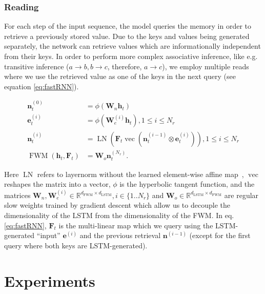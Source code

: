 \documentclass{article} \usepackage{iclr2021_conference,times}
\def\ve{{\bm{e}}}
\def\vh{{\bm{h}}}
\def\vn{{\bm{n}}}
\def\mF{{\bm{F}}}
\def\mW{{\bm{W}}}
\DeclareMathOperator{\vect}{vec}
\DeclareMathOperator{\LN}{\mathrm{LN}}
\DeclareMathOperator{\FWM}{\mathrm{FWM}}
\begin{document}
\subsubsection{Reading}
For each step of the input sequence, the model queries the memory in order to retrieve a previously stored value. 
Due to the keys and values being generated separately, the network can retrieve values which are informationally independent from their keys. In order to perform more complex associative inference, like e.g. transitive inference ($a\rightarrow b,b\rightarrow c$, therefore, $a\rightarrow c$), we employ multiple reads where we use the retrieved value as one of the keys in the next query (see equation \ref{eq:fastRNN}). 

\begin{align}
    \vn_t^{(0)} &= \phi(\mW_n\vh_t) \\
    \ve_t^{(i)} &= \phi(\mW_e^{(i)}\vh_t), 1 \leq i \leq N_r  \\
    \vn_t^{(i)} &= \LN(\mF_t \vect(\vn_t^{(i-1)} \otimes \ve_t^{(i)})), 1 \leq i \leq N_r  \label{eq:fastRNN}\\
    \FWM(\vh_t, \mF_t) &= \mW_o \vn_t^{(N_r)}.
\end{align}

Here $\LN$ refers to layernorm without the learned element-wise affine map~\citep{ba2016layer}, $\vect$ reshapes the matrix into a vector, $\phi$ is the hyperbolic tangent function, and the matrices $\mW_n,\mW_e^{(i)} \in \mathbb{R}^{d_\text{FWM} \times d_\text{LSTM}}, i \in \{1..N_r\} $ and $\mW_o \in \mathbb{R}^{d_\text{LSTM} \times d_\text{FWM}}$ are regular slow weights trained by gradient descent which allow us to decouple the dimensionality of the LSTM from the dimensionality of the FWM.
In eq. \ref{eq:fastRNN}, $\mF_t$ is the multi-linear map which we query using the LSTM-generated ``input'' $\ve^{(i)}$ and the previous retrieval $\vn^{(i-1)}$ (except for the first query where both keys are LSTM-generated). 



\section{Experiments}
\label{sec:experiments}
\end{document}
